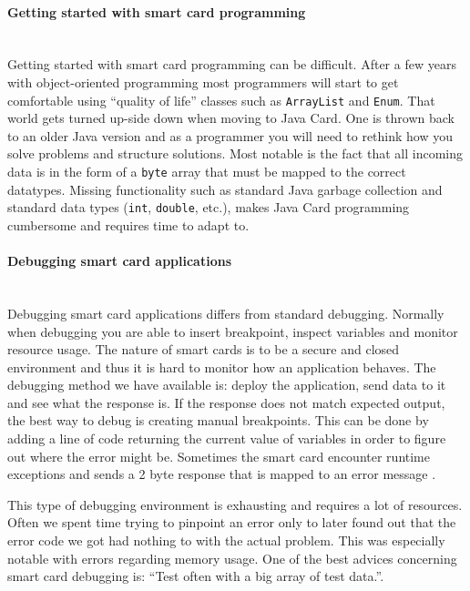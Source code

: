 \paragraph{Getting started with smart card programming}\mbox{}\\
Getting started with smart card programming can be difficult. After a few years with object-oriented programming most programmers will start to get comfortable using ``quality of life'' classes such as \texttt{ArrayList} and \texttt{Enum}. That world gets turned up-side down when moving to Java Card. One is  thrown back to an older Java version and as a programmer you will need to rethink how you solve problems and structure solutions. Most notable is the fact that all incoming data is in the form of a \texttt{byte} array that must be mapped to the correct datatypes. Missing functionality such as standard Java garbage collection and standard data types (\texttt{int}, \texttt{double}, etc.), makes Java Card programming cumbersome and requires time to adapt to.

\paragraph{Debugging smart card applications}\mbox{}\\
Debugging smart card applications differs from standard debugging. Normally when debugging you are able to insert breakpoint, inspect variables and monitor resource usage. The nature of smart cards is to be a secure and closed environment and thus it is hard to monitor how an application behaves. The debugging method we have available is: deploy the application, send data to it and see what the response is. If the response does not match expected output, the best way to debug is creating manual breakpoints. This can be done by adding a line of code returning the current value of variables in order to figure out where the error might be. Sometimes the smart card encounter runtime exceptions and sends a 2 byte response that is mapped to an error message \cite{javacardErrors}.

This type of debugging environment is exhausting and requires a lot of resources. Often we spent time trying to pinpoint an error only to later found out that the error code we got had nothing to with the actual problem. This was especially notable with errors regarding memory usage. One of the best advices concerning smart card debugging is: ``Test often with a big array of test data.''.

